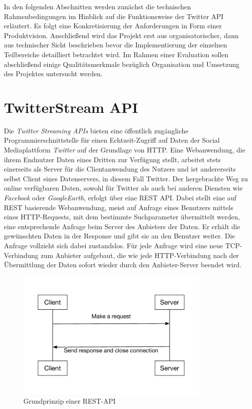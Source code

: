 In den folgenden Abschnitten werden zunächst die technischen Rahmenbedingungen im Hinblick auf die Funktionsweise der Twitter API erläutert. Es folgt eine Konkretisierung der Anforderungen in Form einer Produktvision. Anschließend wird das Projekt erst aus organisatorischer, dann aus technischer Sicht beschrieben bevor die Implementierung der einzelnen Teilbereiche detailliert betrachtet wird. Im Rahmen einer Evaluation sollen abschließend einige Qualitätsmerkmale bezüglich Organisation und Umsetzung des Projektes untersucht werden.
\newpage
\section{TwitterStream API}
%
Die \textit{Twitter Streaming APIs} bieten eine öffentlich zugängliche Programmierschnittstelle für einen Echtzeit-Zugriff auf Daten der Social Mediaplattform \textit{Twitter} auf der Grundlage von HTTP. Eine Webanwendung, die ihrem Endnutzer Daten eines Dritten zur Verfügung stellt, arbeitet stets einerseits als Server für die Clientanwendung des Nutzers und ist andererseits selbst Client eines Datenservers, in diesem Fall Twitter. Der hergebrachte Weg zu online verfügbaren Daten, sowohl für Twitter als auch bei anderen Diensten wie \textit{Facebook} oder \textit{GoogleEarth}, erfolgt über eine REST API. Dabei stellt eine auf REST basierende Webanwendung, meist auf Anfrage eines Benutzers mittels eines HTTP-Requests, mit dem bestimmte Suchparameter übermittelt werden, eine entsprechende Anfrage beim Server des Anbieters der Daten. Er erhält die gewünschten Daten in der Response und gibt sie an den Benutzer weiter. Die Anfrage vollzieht sich dabei zustandslos. Für jede Anfrage wird eine neue \acs{TCP}-Verbindung zum Anbieter aufgebaut, die wie jede HTTP-Verbindung nach der Übermittlung der Daten sofort wieder durch den Anbieter-Server beendet wird.
%
\begin{figure}[!h]
    \centering
    \includegraphics[width=0.85\textwidth]{Graphics/normal_rest_api}
    \caption[Grundprinzip einer REST-API, in Anlehnung an \cite{quora:api}]{Grundprinzip einer REST-API \cite{quora:api}}
   \label{fig:restapi}
\end{figure}

